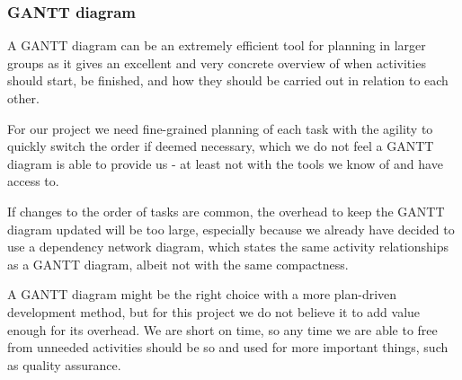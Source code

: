 \subsubsection{GANTT diagram}
A GANTT diagram can be an extremely efficient tool for planning in larger groups as it gives an excellent and very concrete overview of when activities should start, be finished, and how they should be carried out in relation to each other.

For our project we need fine-grained planning of each task with the agility to quickly switch the order if deemed necessary, which we do not feel a GANTT diagram is able to provide us - at least not with the tools we know of and have access to.

If changes to the order of tasks are common, the overhead to keep the GANTT diagram updated will be too large, especially because we already have decided to use a dependency network diagram, which states the same activity relationships as a GANTT diagram, albeit not with the same compactness.

A GANTT diagram might be the right choice with a more plan-driven development method, but for this project we do not believe it to add value enough for its overhead. We are short on time, so any time we are able to free from unneeded activities should be so and used for more important things, such as quality assurance.